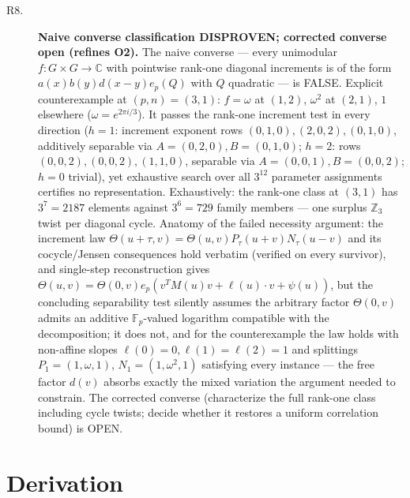 \documentclass[11pt]{article}
\begin{document}
\begin{description}
\item[R8.] \textbf{Naive converse classification DISPROVEN; corrected converse open (refines O2).} The naive converse — every unimodular $f:G\times G\to\mathbb{C}$ with pointwise rank-one diagonal increments is of the form $a(x)b(y)d(x-y)e_p(Q)$ with $Q$ quadratic — is FALSE. Explicit counterexample at $(p,n)=(3,1)$: $f=\omega$ at $(1,2)$, $\omega^{2}$ at $(2,1)$, $1$ elsewhere ($\omega=e^{2\pi i/3}$). It passes the rank-one increment test in every direction ($h=1$: increment exponent rows $(0,1,0),(2,0,2),(0,1,0)$, additively separable via $A=(0,2,0),B=(0,1,0)$; $h=2$: rows $(0,0,2),(0,0,2),(1,1,0)$, separable via $A=(0,0,1),B=(0,0,2)$; $h=0$ trivial), yet exhaustive search over all $3^{12}$ parameter assignments certifies no representation. Exhaustively: the rank-one class at $(3,1)$ has $3^{7}=2187$ elements against $3^{6}=729$ family members — one surplus $\mathbb{Z}_3$ twist per diagonal cycle. Anatomy of the failed necessity argument: the increment law $\Theta(u+\tau,v)=\Theta(u,v)P_\tau(u+v)N_\tau(u-v)$ and its cocycle/Jensen consequences hold verbatim (verified on every survivor), and single-step reconstruction gives $\Theta(u,v)=\Theta(0,v)e_p(v^{T}M(u)v+\ell(u)\cdot v+\psi(u))$, but the concluding separability test silently assumes the arbitrary factor $\Theta(0,v)$ admits an additive $\mathbb{F}_p$-valued logarithm compatible with the decomposition; it does not, and for the counterexample the law holds with non-affine slopes $\ell(0)=0,\ell(1)=\ell(2)=1$ and splittings $P_1=(1,\omega,1)$, $N_1=(1,\omega^{2},1)$ satisfying every instance — the free factor $d(v)$ absorbs exactly the mixed variation the argument needed to constrain. The corrected converse (characterize the full rank-one class including cycle twists; decide whether it restores a uniform correlation bound) is OPEN.
\end{description}

\section*{Derivation}
\end{document}
